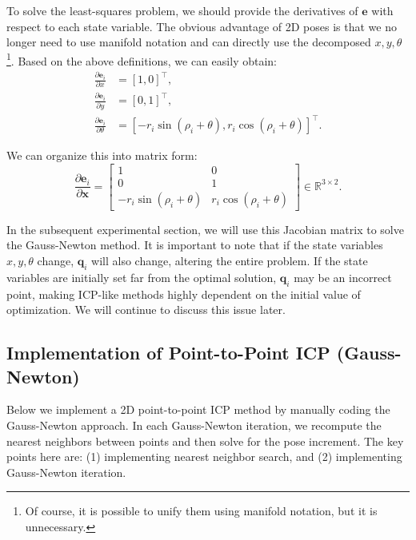 To solve the least-squares problem, we should provide the derivatives of $\mathbf{e}$ with respect to each state variable. The obvious advantage of 2D poses is that we no longer need to use manifold notation and can directly use the decomposed $x, y, \theta$\footnote{Of course, it is possible to unify them using manifold notation, but it is unnecessary.}. Based on the above definitions, we can easily obtain:
\begin{subequations}\label{key}
	\begin{align}
		\frac{\partial{\mathbf{e}_i}}{\partial x} &= [1, 0]^\top, \\
		\frac{\partial{\mathbf{e}_i}}{\partial y} &= [0, 1]^\top, \\
		\frac{\partial{\mathbf{e}_i}}{\partial \theta} &= [-r_i \sin (\rho_i + \theta), r_i \cos (\rho_i+\theta)]^\top.
	\end{align}
\end{subequations}

We can organize this into matrix form:
\begin{equation}\label{eq:dpw-dx}
	\frac{\partial \mathbf{e}_i}{\partial \mathbf{x}} = \begin{bmatrix}
		1 & 0\\
		0 & 1\\
		-r_i \sin (\rho_i + \theta) & r_i \cos (\rho_i+\theta)
	\end{bmatrix} \in \mathbb{R}^{3\times 2}.
\end{equation}

In the subsequent experimental section, we will use this Jacobian matrix to solve the Gauss-Newton method. It is important to note that if the state variables $x, y, \theta$ change, $\mathbf{q}_i$ will also change, altering the entire problem. If the state variables are initially set far from the optimal solution, $\mathbf{q}_i$ may be an incorrect point, making ICP-like methods highly dependent on the initial value of optimization. We will continue to discuss this issue later.

\subsection{Implementation of Point-to-Point ICP (Gauss-Newton)}  
Below we implement a 2D point-to-point ICP method by manually coding the Gauss-Newton approach. In each Gauss-Newton iteration, we recompute the nearest neighbors between points and then solve for the pose increment. The key points here are: (1) implementing nearest neighbor search, and (2) implementing Gauss-Newton iteration.  

